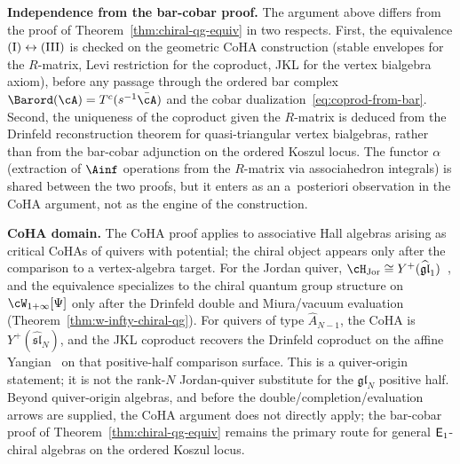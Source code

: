 \begin{remark}
\smallskip
\noindent\textbf{Independence from the bar-cobar proof.}
The argument above differs from the proof of
Theorem~\ref{thm:chiral-qg-equiv} in two respects.
First, the equivalence $\textup{(I)} \leftrightarrow
\textup{(III)}$ is checked on the geometric CoHA
construction (stable envelopes for the $R$-matrix,
Levi restriction for the coproduct, JKL for the vertex
bialgebra axiom), before any passage through the ordered bar complex
$\Barord(\cA) = T^c(s^{-1}\bar{\cA})$ and the
cobar dualization~\eqref{eq:coprod-from-bar}. Second, the
uniqueness of the coproduct given the $R$-matrix is
deduced from the Drinfeld reconstruction theorem for
quasi-triangular vertex bialgebras, rather than from the
bar-cobar adjunction on the ordered Koszul locus. The functor
$\alpha$ (extraction of $\Ainf$ operations from the
$R$-matrix via associahedron integrals) is shared between
the two proofs, but it enters as an a~posteriori observation
in the CoHA argument, not as the engine of the
construction.

\smallskip
\noindent\textbf{CoHA domain.}
The CoHA proof applies to associative Hall algebras
arising as critical CoHAs of quivers with potential; the chiral object
appears only after the comparison to a vertex-algebra target.
For the Jordan quiver, $\cH_{\mathrm{Jor}} \cong
Y^+(\widehat{\mathfrak{gl}}_1)$~\cite{SV13}, and the
equivalence specializes to the chiral quantum group
structure on $\cW_{1+\infty}[\Psi]$ only after the
Drinfeld double and Miura/vacuum evaluation
(Theorem~\ref{thm:w-infty-chiral-qg}).
For quivers of type $\widehat{A}_{N-1}$, the CoHA
is $Y^+(\widehat{\mathfrak{sl}}_N)$, and the JKL
coproduct recovers the Drinfeld coproduct on the affine
Yangian~\cite{JKL26} on that positive-half comparison
surface. This is a quiver-origin statement; it is not the
rank-$N$ Jordan-quiver substitute for the
$\mathfrak{gl}_N$ positive half. Beyond quiver-origin
algebras, and before the double/completion/evaluation arrows
are supplied, the CoHA argument does not directly apply; the
bar-cobar proof of Theorem~\ref{thm:chiral-qg-equiv} remains
the primary route for general $\mathsf{E}_1$-chiral algebras on the
ordered Koszul locus.
\end{remark}

